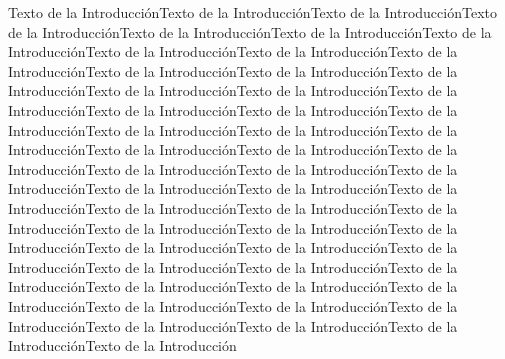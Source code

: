 Texto de la IntroducciónTexto de la IntroducciónTexto de la IntroducciónTexto de la IntroducciónTexto de la IntroducciónTexto de la IntroducciónTexto de la IntroducciónTexto de la IntroducciónTexto de la IntroducciónTexto de la IntroducciónTexto de la IntroducciónTexto de la IntroducciónTexto de la IntroducciónTexto de la IntroducciónTexto de la IntroducciónTexto de la IntroducciónTexto de la IntroducciónTexto de la IntroducciónTexto de la IntroducciónTexto de la IntroducciónTexto de la IntroducciónTexto de la IntroducciónTexto de la IntroducciónTexto de la IntroducciónTexto de la IntroducciónTexto de la IntroducciónTexto de la IntroducciónTexto de la IntroducciónTexto de la IntroducciónTexto de la IntroducciónTexto de la IntroducciónTexto de la IntroducciónTexto de la IntroducciónTexto de la IntroducciónTexto de la IntroducciónTexto de la IntroducciónTexto de la IntroducciónTexto de la IntroducciónTexto de la IntroducciónTexto de la IntroducciónTexto de la IntroducciónTexto de la IntroducciónTexto de la IntroducciónTexto de la IntroducciónTexto de la IntroducciónTexto de la IntroducciónTexto de la IntroducciónTexto de la IntroducciónTexto de la IntroducciónTexto de la IntroducciónTexto de la IntroducciónTexto de la IntroducciónTexto de la Introducción